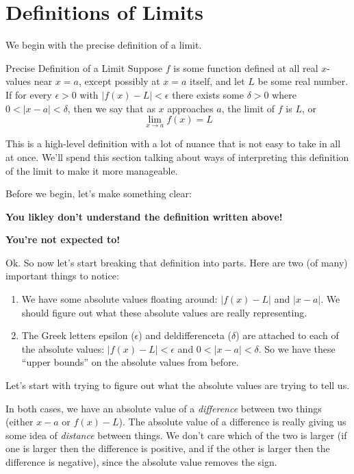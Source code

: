 \section{Definitions of Limits}

We begin with the precise definition of a limit.

\begin{defn}{Precise Definition of a Limit}
  Suppose $f$ is some function defined at all real $x$-values near $x=a$, except possibly at $x=a$ itself, and let $L$ be some real number. If for every $\epsilon>0$ with $|f(x)-L|<\epsilon$ there exists some $\delta>0$ where $0<|x-a|<\delta$, then we say that as $x$ approaches $a$, the limit of $f$ is $L$, or
  \[ \lim_{x\to a} f(x) = L\]
\end{defn}

This is a high-level definition with a lot of nuance that is not easy to take in all at once. We'll spend this section talking about ways of interpreting this definition of the limit to make it more manageable.

Before we begin, let's make something clear:

\begin{center}
  \textbf{You likley don't understand the definition written above!}

  \textbf{You're not expected to!}
\end{center}

Ok. So now let's start breaking that definition into parts. Here are two (of many) important things to notice:
\begin{enumerate}
  \item We have some absolute values floating around: $|f(x)-L|$ and $|x-a|$. We should figure out what these absolute values are really representing.
  \item The Greek letters epsilon ($\epsilon$) and deldifferenceta ($\delta$) are attached to each of the absolute values: $|f(x)-L|<\epsilon$ and $0<|x-a|<\delta$. So we have these ``upper bounds'' on the absolute values from before.
\end{enumerate}

Let's start with trying to figure out what the absolute values are trying to tell us.

In both cases, we have an absolute value of a \textit{difference} between two things (either $x-a$ or $f(x)-L$). The absolute value of a difference is really giving us some idea of \textit{distance} between things. We don't care which of the two is larger (if one is larger then the difference is positive, and if the other is larger then the difference is negative), since the absolute value removes the sign.

